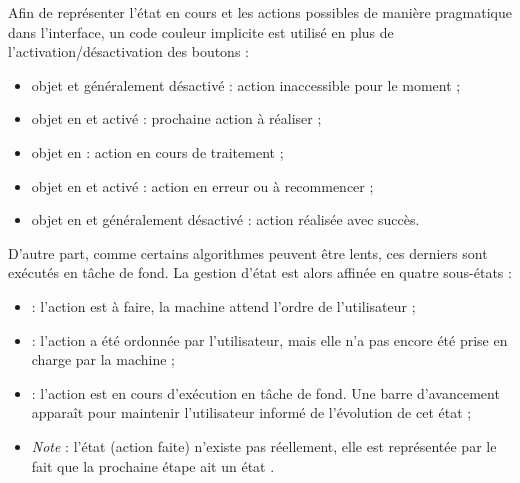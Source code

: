 			Afin de représenter l'état en cours et les actions possibles de manière pragmatique dans l'interface, un code couleur implicite est utilisé en plus de l'activation/désactivation des boutons :
			\begin{itemize}
				\item objet  et généralement désactivé : action inaccessible pour le moment ;
				\item objet en  et activé : prochaine action à réaliser ;
				\item objet en  : action en cours de traitement ;
				\item objet en  et activé : action en erreur ou à recommencer ;
				\item objet en  et généralement désactivé : action réalisée avec succès.
			\end{itemize}
			
			D'autre part, comme certains algorithmes peuvent être lents, ces derniers sont exécutés en tâche de fond.
			La gestion d'état est alors affinée en quatre sous-états :
			\begin{itemize}
				\item {} : l'action est à faire, la machine attend l'ordre de l'utilisateur ;
				\item {} : l'action a été ordonnée par l'utilisateur, mais elle n'a pas encore été prise en charge par la machine ;
				\item {} : l'action est en cours d'exécution en tâche de fond.
				Une barre d'avancement apparaît pour maintenir l'utilisateur informé de l'évolution de cet état ;
				\item \textit{Note} : l'état  (action faite) n'existe pas réellement, elle est représentée par le fait que la prochaine étape ait un état .
			\end{itemize}
			
